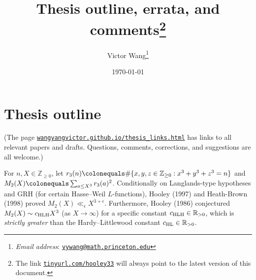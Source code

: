 \documentclass[12pt]{article}
\title{Thesis outline, errata, and comments\thanks{The link \href{https://tinyurl.com/hooley33}{\nolinkurl{tinyurl.com/hooley33}} will always point to the latest version of this document.}}
\author{Victor Wang\thanks{\emph{Email address}: \href{mailto:vywang@math.princeton.edu}{\nolinkurl{vywang@math.princeton.edu}}}}
\date{\today}
\begin{document}
\maketitle
\tableofcontents

\section{Thesis outline}

(The page \href{https://wangyangvictor.github.io/thesis_links.html}{\nolinkurl{wangyangvictor.github.io/thesis_links.html}} has links to all relevant papers and drafts.
Questions, comments, corrections, and suggestions are all welcome.)

For $n,X\in \mathbb{Z}_{\geq0}$,
let $r_3(n)\colonequals \#\{x,y,z\in \mathbb{Z}_{\geq0}: x^3+y^3+z^3=n\}$ and $M_2(X)\colonequals \sum_{a\leq X^3}r_3(a)^2$.
Conditionally on Langlands-type hypotheses and GRH (for certain Hasse--Weil $L$-functions),
Hooley (1997) and Heath-Brown (1998) proved $M_2(X)\ll_\epsilon X^{3+\epsilon}$.
Furthermore,
Hooley (1986) conjectured $M_2(X)\sim c_{\textnormal{HLH}}X^3$ (as $X\to\infty$) for a specific constant $c_{\textnormal{HLH}}\in \mathbb{R}_{>0}$,
which is \emph{strictly greater} than the Hardy--Littlewood constant $c_{\textnormal{HL}}\in \mathbb{R}_{>0}$.
\end{document}
